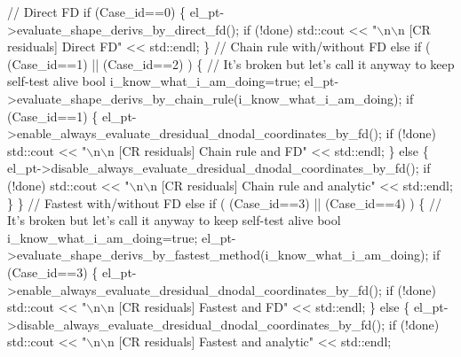 \begin{DoxyCodeInclude}
     \textcolor{comment}{// Direct FD}
     \textcolor{keywordflow}{if} (Case\_id==0)
      \{
       el\_pt->evaluate\_shape\_derivs\_by\_direct\_fd();       
       \textcolor{keywordflow}{if} (!done) std::cout << \textcolor{stringliteral}{"\(\backslash\)n\(\backslash\)n [CR residuals] Direct FD"} << std::endl;
      \}
     \textcolor{comment}{// Chain rule with/without FD}
     \textcolor{keywordflow}{else} \textcolor{keywordflow}{if} ( (Case\_id==1) ||  (Case\_id==2) )
      \{
       \textcolor{comment}{// It's broken but let's call it anyway to keep self-test alive}
       \textcolor{keywordtype}{bool} i\_know\_what\_i\_am\_doing=\textcolor{keyword}{true};
       el\_pt->evaluate\_shape\_derivs\_by\_chain\_rule(i\_know\_what\_i\_am\_doing);
       \textcolor{keywordflow}{if} (Case\_id==1)
        \{
         el\_pt->enable\_always\_evaluate\_dresidual\_dnodal\_coordinates\_by\_fd();
         \textcolor{keywordflow}{if} (!done) std::cout << \textcolor{stringliteral}{"\(\backslash\)n\(\backslash\)n [CR residuals] Chain rule and FD"} 
                              << std::endl;
        \}
       \textcolor{keywordflow}{else}
        \{
         el\_pt->disable\_always\_evaluate\_dresidual\_dnodal\_coordinates\_by\_fd();
         \textcolor{keywordflow}{if} (!done) std::cout << \textcolor{stringliteral}{"\(\backslash\)n\(\backslash\)n [CR residuals] Chain rule and analytic"} 
                              << std::endl;
        \}
      \}
     \textcolor{comment}{// Fastest with/without FD}
     \textcolor{keywordflow}{else} \textcolor{keywordflow}{if} ( (Case\_id==3) ||  (Case\_id==4) )
      \{
       \textcolor{comment}{// It's broken but let's call it anyway to keep self-test alive}
       \textcolor{keywordtype}{bool} i\_know\_what\_i\_am\_doing=\textcolor{keyword}{true};
       el\_pt->evaluate\_shape\_derivs\_by\_fastest\_method(i\_know\_what\_i\_am\_doing);
       \textcolor{keywordflow}{if} (Case\_id==3)
        \{
         el\_pt->enable\_always\_evaluate\_dresidual\_dnodal\_coordinates\_by\_fd();
         \textcolor{keywordflow}{if} (!done) std::cout << \textcolor{stringliteral}{"\(\backslash\)n\(\backslash\)n [CR residuals] Fastest and FD"} 
                              << std::endl;
        \}
       \textcolor{keywordflow}{else}
        \{
         el\_pt->disable\_always\_evaluate\_dresidual\_dnodal\_coordinates\_by\_fd();
         \textcolor{keywordflow}{if} (!done) std::cout << \textcolor{stringliteral}{"\(\backslash\)n\(\backslash\)n [CR residuals] Fastest and analytic"} 
                              << std::endl;
         

\end{DoxyCodeInclude}
